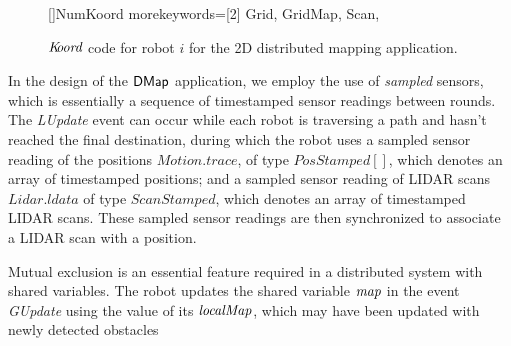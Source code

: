 \begin{figure}[!htbp]
    \noindent
    \begin{center}
        []{NumKoord}{
            morekeywords=[2]{
                Grid, GridMap,
                Scan,
            }
        }
        {}
        {}
    \end{center}

    \caption{$\emph{K\kern-2pt oord}$ code for robot $i$ for the 2D distributed mapping application.}
    \label{fig:mapapp}
\end{figure}

In the design of the ${\sf DMap}$ application, we employ the use of \emph{sampled} sensors, which is essentially a sequence of timestamped sensor readings between rounds. The \emph{LUpdate} event can occur while each robot is traversing a path and hasn't reached the final destination, during which the robot uses a sampled sensor reading of the positions $\mathit{Motion.trace}$, of type $\mathit{PosStamped}[]$, which denotes an array of timestamped positions; and a sampled sensor reading of LIDAR scans $\mathit{Lidar.ldata}$ of type $\mathit{ScanStamped}$, which denotes an array of timestamped LIDAR scans. These sampled sensor readings are then synchronized to associate a LIDAR scan with a position.

Mutual exclusion is an essential feature required in a distributed system with shared variables. The robot updates the shared variable $\mathit{map}$ in the event \emph{GUpdate} using the value of its $\mathit{localMap}$, which may have been updated with newly detected obstacles